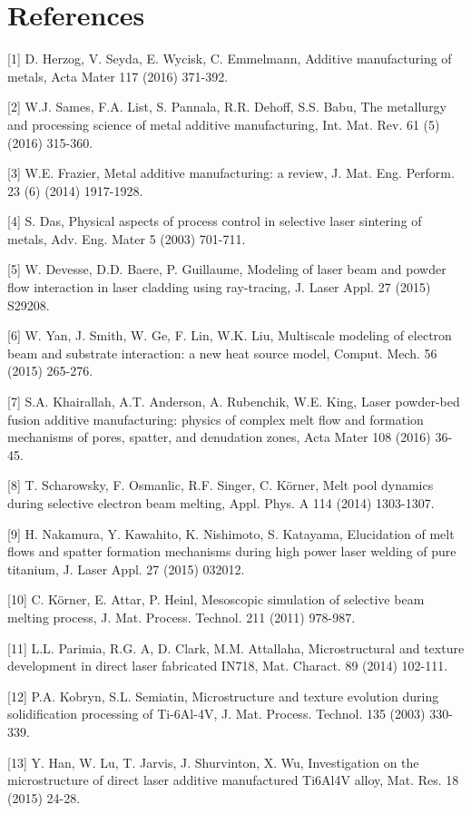 \documentclass[10pt]{article}
\begin{document}
\section*{References}
[1] D. Herzog, V. Seyda, E. Wycisk, C. Emmelmann, Additive manufacturing of metals, Acta Mater 117 (2016) 371-392.

[2] W.J. Sames, F.A. List, S. Pannala, R.R. Dehoff, S.S. Babu, The metallurgy and processing science of metal additive manufacturing, Int. Mat. Rev. 61 (5) (2016) 315-360.

[3] W.E. Frazier, Metal additive manufacturing: a review, J. Mat. Eng. Perform. 23 (6) (2014) 1917-1928.

[4] S. Das, Physical aspects of process control in selective laser sintering of metals, Adv. Eng. Mater 5 (2003) 701-711.

[5] W. Devesse, D.D. Baere, P. Guillaume, Modeling of laser beam and powder flow interaction in laser cladding using ray-tracing, J. Laser Appl. 27 (2015) S29208.

[6] W. Yan, J. Smith, W. Ge, F. Lin, W.K. Liu, Multiscale modeling of electron beam and substrate interaction: a new heat source model, Comput. Mech. 56 (2015) 265-276.

[7] S.A. Khairallah, A.T. Anderson, A. Rubenchik, W.E. King, Laser powder-bed fusion additive manufacturing: physics of complex melt flow and formation mechanisms of pores, spatter, and denudation zones, Acta Mater 108 (2016) 36-45.

[8] T. Scharowsky, F. Osmanlic, R.F. Singer, C. Körner, Melt pool dynamics during selective electron beam melting, Appl. Phys. A 114 (2014) 1303-1307.

[9] H. Nakamura, Y. Kawahito, K. Nishimoto, S. Katayama, Elucidation of melt flows and spatter formation mechanisms during high power laser welding of pure titanium, J. Laser Appl. 27 (2015) 032012.

[10] C. Körner, E. Attar, P. Heinl, Mesoscopic simulation of selective beam melting process, J. Mat. Process. Technol. 211 (2011) 978-987.

[11] L.L. Parimia, R.G. A, D. Clark, M.M. Attallaha, Microstructural and texture development in direct laser fabricated IN718, Mat. Charact. 89 (2014) 102-111.

[12] P.A. Kobryn, S.L. Semiatin, Microstructure and texture evolution during solidification processing of Ti-6Al-4V, J. Mat. Process. Technol. 135 (2003) 330-339.

[13] Y. Han, W. Lu, T. Jarvis, J. Shurvinton, X. Wu, Investigation on the microstructure of direct laser additive manufactured Ti6Al4V alloy, Mat. Res. 18 (2015) 24-28.
\end{document}
